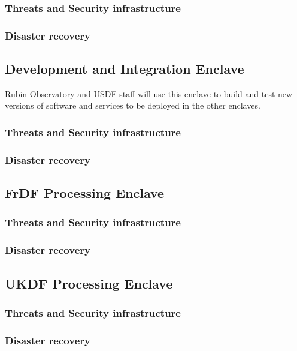 \subsubsection{ Threats and Security infrastructure}
\subsubsection{Disaster recovery}

\subsection{Development and Integration  Enclave}
Rubin Observatory and USDF staff will use this enclave to build and test new versions of software and services to be deployed in the other enclaves.

\subsubsection{Threats and Security infrastructure}
\subsubsection{Disaster recovery}


\subsection{FrDF Processing  Enclave}
\subsubsection{Threats and Security infrastructure}
\subsubsection{Disaster recovery}

\subsection{UKDF Processing  Enclave}
\subsubsection{Threats and Security infrastructure}
\subsubsection{Disaster recovery}
